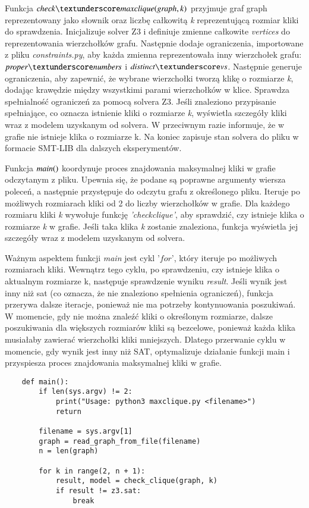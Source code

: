 Funkcja $\checkclique$ przyjmuje graf graph reprezentowany jako słownik oraz liczbę całkowitą \textit{k} reprezentującą rozmiar kliki do sprawdzenia. Inicjalizuje solver Z3 i definiuje zmienne całkowite \textit{vertices} do reprezentowania wierzchołków grafu. Następnie dodaje ograniczenia, importowane z pliku \textit{constraints.py}, aby każda zmienna reprezentowała inny wierzchołek grafu: $\propernumbers$ i $\distinctvs$. Następnie generuje ograniczenia, aby zapewnić, że wybrane wierzchołki tworzą klikę o rozmiarze \textit{k}, dodając krawędzie między wszystkimi parami wierzchołków w klice. Sprawdza spełnialność ograniczeń za pomocą solvera Z3. Jeśli znaleziono przypisanie spełniające, co oznacza istnienie kliki o rozmiarze \textit{k}, wyświetla szczegóły kliki wraz z modelem uzyskanym od solvera. W przeciwnym razie informuje, że w grafie nie istnieje klika o rozmiarze k. Na koniec zapisuje stan solvera do pliku w formacie SMT-LIB dla dalszych eksperymentów.



Funkcja ${\mathit{main()}}$ koordynuje proces znajdowania maksymalnej kliki w grafie odczytanym z pliku. Upewnia się, że podane są poprawne argumenty wiersza poleceń, a następnie przystępuje do odczytu grafu z określonego pliku. Iteruje po możliwych rozmiarach kliki od 2 do liczby wierzchołków w grafie. Dla każdego rozmiaru kliki \textit{k} wywołuje funkcję \textit{'check\textunderscore clique'}, aby sprawdzić, czy istnieje klika o rozmiarze \textit{k} w grafie. Jeśli taka klika \textit{k} zostanie znaleziona, funkcja wyświetla jej szczegóły wraz z modelem uzyskanym od solvera. 

Ważnym aspektem funkcji \textit{main} jest cykl $\textit{'for'}$, który iteruje po możliwych rozmiarach kliki. Wewnątrz tego cyklu, po sprawdzeniu, czy istnieje klika o aktualnym rozmiarze k, następuje sprawdzenie wyniku \textit{result}. Jeśli wynik jest inny niż sat (co oznacza, że nie znaleziono spełnienia ograniczeń), funkcja przerywa dalsze iteracje, ponieważ nie ma potrzeby kontynuowania poszukiwań. W momencie, gdy nie można znaleźć kliki o określonym rozmiarze, dalsze poszukiwania dla większych rozmiarów kliki są bezcelowe, ponieważ każda klika musiałaby zawierać wierzchołki kliki mniejszych. Dlatego przerwanie cyklu w momencie, gdy wynik jest inny niż SAT, optymalizuje działanie funkcji main i przyspiesza proces znajdowania maksymalnej kliki w grafie.

\begin{lstlisting}
	def main():
		if len(sys.argv) != 2:
			print("Usage: python3 maxclique.py <filename>")
			return
		
		filename = sys.argv[1]
		graph = read_graph_from_file(filename)
		n = len(graph)
		
		for k in range(2, n + 1):
			result, model = check_clique(graph, k)
			if result != z3.sat:
				break
\end{lstlisting}


